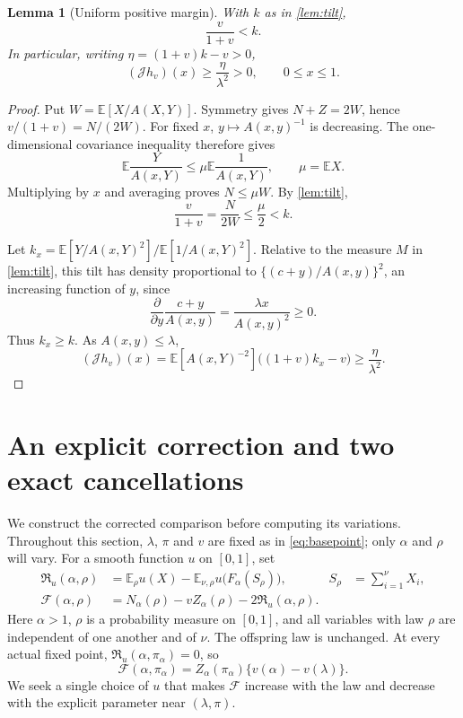 \documentclass[11pt,a4paper]{article}
\numberwithin{equation}{section}
\theoremstyle{notethm}
\newtheorem{lemma}[lemma]{Lemma}
\theoremstyle{definition}
\newcommand{\E}{\mathbb E}
\newcommand{\cJ}{\mathcal J}
\newcommand{\cF}{\mathscr F}
\newcommand{\res}{\mathfrak R}
\begin{document}
\begin{lemma}[Uniform positive margin]\label{lem:positive-kernel}
With $k$ as in \cref{lem:tilt},
\begin{equation}\label{eq:threshold-k}
 \frac{v}{1+v}<k.
\end{equation}
In particular, writing $\eta=(1+v)k-v>0$,
\begin{equation}\label{eq:J-positive}
 (\cJ h_v)(x)\ge\frac{\eta}{\lambda^2}>0,
 \qquad 0\le x\le1.
\end{equation}
\end{lemma}

\begin{proof}
Put $W=\E[X/A(X,Y)]$. Symmetry gives $N+Z=2W$, hence
$v/(1+v)=N/(2W)$. For fixed $x$, $y\mapsto A(x,y)^{-1}$ is decreasing.
The one-dimensional covariance inequality therefore gives
\[
 \E\frac{Y}{A(x,Y)}\le\mu\E\frac1{A(x,Y)},\qquad \mu=\E X.
\]
Multiplying by $x$ and averaging proves $N\le\mu W$. By \cref{lem:tilt},
\begin{equation}\label{eq:v-mu-k}
 \frac{v}{1+v}=\frac N{2W}\le\frac\mu2<k.
\end{equation}

Let $k_x=\E[Y/A(x,Y)^2]/\E[1/A(x,Y)^2]$. Relative to the measure $M$ in
\cref{lem:tilt}, this tilt has density proportional to
$\{(c+y)/A(x,y)\}^2$, an increasing function of $y$, since
\begin{equation}\label{eq:ratio-derivative}
 \frac{\partial}{\partial y}\frac{c+y}{A(x,y)}
 =\frac{\lambda x}{A(x,y)^2}\ge0.
\end{equation}
Thus $k_x\ge k$. As $A(x,y)\le\lambda$,
\[
 (\cJ h_v)(x)
 =\E[A(x,Y)^{-2}]\bigl((1+v)k_x-v\bigr)
 \ge\frac{\eta}{\lambda^2}.
\]
\end{proof}

\section{An explicit correction and two exact cancellations}\label{sec:correction}

We construct the corrected comparison before computing its variations.
Throughout this section, $\lambda$, $\pi$ and $v$ are fixed as in
\eqref{eq:basepoint}; only $\alpha$ and $\rho$ will vary. For a smooth
function $u$ on $[0,1]$, set
\begin{align}
 \res_u(\alpha,\rho)
 &=\E_\rho u(X)-\E_{\nu,\rho}u\bigl(F_\alpha(S_\rho)\bigr),
 &S_\rho&=\sum_{i=1}^{\nu}X_i,\label{eq:residual}\\
 \cF(\alpha,\rho)
 &=N_\alpha(\rho)-vZ_\alpha(\rho)-2\res_u(\alpha,\rho).
 \label{eq:corrected-functional}
\end{align}
Here $\alpha>1$, $\rho$ is a probability measure on $[0,1]$, and all
variables with law $\rho$ are independent of one another and of $\nu$.
The offspring law is unchanged. At every actual fixed point,
$\res_u(\alpha,\pi_\alpha)=0$, so
\begin{equation}\label{eq:on-curve}
 \boxed{\quad
 \cF(\alpha,\pi_\alpha)
 =Z_\alpha(\pi_\alpha)\{v(\alpha)-v(\lambda)\}.
 \quad}
\end{equation}
We seek a single choice of $u$ that makes $\cF$ increase with the law
and decrease with the explicit parameter near $(\lambda,\pi)$.
\end{document}
